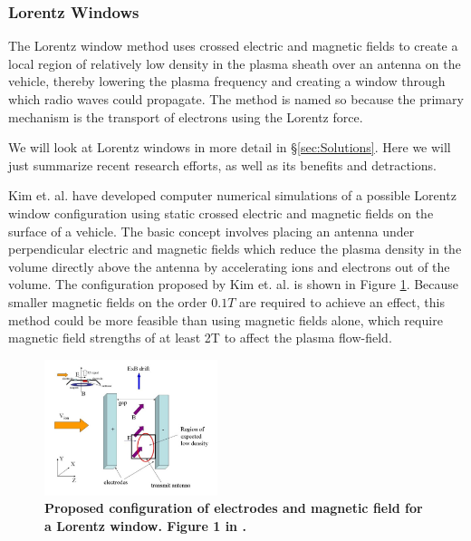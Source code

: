 \documentclass[twocolumn]{article}
\begin{document}
		
		\subsubsection*{Lorentz Windows}
			The Lorentz window method uses crossed electric and magnetic fields to create a local region of relatively low density in the plasma sheath over an antenna on the vehicle, thereby lowering the plasma frequency and creating a window through which radio waves could propagate.
			The method is named so because the primary mechanism is the transport of electrons using the Lorentz force.
			
			We will look at Lorentz windows in more detail in \S\ref{sec:Solutions}.
			Here we will just summarize recent research efforts, as well as its benefits and detractions.
			
			Kim et. al. have developed computer numerical simulations of a possible Lorentz window configuration using static crossed electric and magnetic fields on the surface of a vehicle.\cite{kim_plasma_2007}\cite{kim_analysis_2008}\cite{kim_modeling_2010}
			The basic concept involves placing an antenna under perpendicular electric and magnetic fields which reduce the plasma density in the volume directly above the antenna by accelerating ions and electrons out of the volume.
			The configuration proposed by Kim et. al. is shown in Figure \ref{fig:KimExBConfig}.
			Because smaller magnetic fields on the order $0.1 T$ are required to achieve an effect, this method could be more feasible than using magnetic fields alone, which require magnetic field strengths of at least 2T to affect the plasma flow-field.\cite{otsu_feasibility_2006}
		
			\begin{figure}[H]
				\centering
					\includegraphics[width=0.45\textwidth]{Images/Kimetal_ExB_config.png}
				\caption{\textbf{Proposed configuration of electrodes and magnetic field for a Lorentz window. Figure 1 in \cite{kim_plasma_2007}.}}
				\label{fig:KimExBConfig}
			\end{figure}
		
\end{document}
